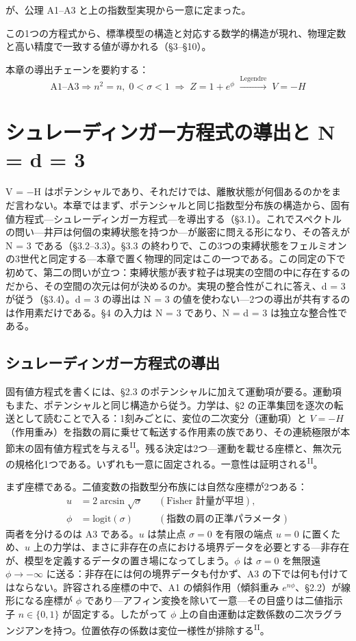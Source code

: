 \documentclass[fontsize=11pt,paper=a4,lualatex]{jlreq}
\newcommand{\PII}{\textsuperscript{\textup{II}}}
\begin{document}
が、公理 A1--A3 と上の指数型実現から一意に定まった。

この1つの方程式から、標準模型の構造と対応する数学的構造が現れ、物理定数と高い精度で一致する値が導かれる（§3--§10）。

本章の導出チェーンを要約する：
\[
  \text{A1--A3} \Rightarrow n^2{=}n,\; 0{<}\sigma{<}1 \;\Rightarrow\; Z = 1{+}e^{\phi}
  \;\xrightarrow{\text{Legendre}}\; V = -H
\]

\section{シュレーディンガー方程式の導出と N = d = 3}\label{sec:eq-two-threes}

V = −H はポテンシャルであり、それだけでは、離散状態が何個あるのかをまだ言わない。本章ではまず、ポテンシャルと同じ指数型分布族の構造から、固有値方程式---シュレーディンガー方程式---を導出する（§3.1）。これでスペクトルの問い---井戸は何個の束縛状態を持つか---が厳密に問える形になり、その答えが N = 3 である（§3.2--3.3）。§3.3 の終わりで、この3つの束縛状態をフェルミオンの3世代と同定する---本章で置く物理的同定はこの一つである。この同定の下で初めて、第二の問いが立つ：束縛状態が表す粒子は現実の空間の中に存在するのだから、その空間の次元は何が決めるのか。実現の整合性がこれに答え、d = 3 が従う（§3.4）。d = 3 の導出は N = 3 の値を使わない---2つの導出が共有するのは作用素だけである。§4 の入力は N = 3 であり、N = d = 3 は独立な整合性である。

\subsection{シュレーディンガー方程式の導出}\label{ux30b7ux30e5ux30ecux30fcux30c7ux30a3ux30f3ux30acux30fcux65b9ux7a0bux5f0f}

固有値方程式を書くには、§2.3 のポテンシャルに加えて運動項が要る。運動項もまた、ポテンシャルと同じ構造から従う。力学は、§2 の正準集団を逐次の転送として読むことで入る：1刻みごとに、変位の二次変分（運動項）と $V = -H$（作用重み）を指数の肩に乗せて転送する作用素の族であり、その連続極限が本節末の固有値方程式を与える\PII{}。残る決定は2つ---運動を載せる座標と、無次元の規格化1つである。いずれも一意に固定される。一意性は証明される\PII{}。

まず座標である。二値変数の指数型分布族には自然な座標が2つある\cite{cencov,amari,ay}：
\[
\begin{aligned}
  u &= 2\arcsin\sqrt{\sigma} &&(\text{Fisher 計量が平坦}),\\
  \phi &= \mathrm{logit}(\sigma) &&(\text{指数の肩の正準パラメータ})
\end{aligned}
\]
両者を分けるのは A3 である。$u$ は禁止点 $\sigma = 0$ を有限の端点 $u = 0$ に置くため、$u$ 上の力学は、まさに非存在の点における境界データを必要とする---非存在が、模型を定義するデータの置き場になってしまう。$\phi$ は $\sigma = 0$ を無限遠 $\phi \to -\infty$ に送る：非存在には何の境界データも付かず、A3 の下では何も付けてはならない。許容される座標の中で、A1 の傾斜作用（傾斜重み $e^{n\phi}$、§2.2）が線形になる座標が $\phi$ であり---アフィン変換を除いて一意---その目盛りは二値指示子 $n \in \{0,1\}$ が固定する。したがって $\phi$ 上の自由運動は定数係数の二次ラグランジアンを持つ。位置依存の係数は変位一様性が排除する\PII{}。
\end{document}

